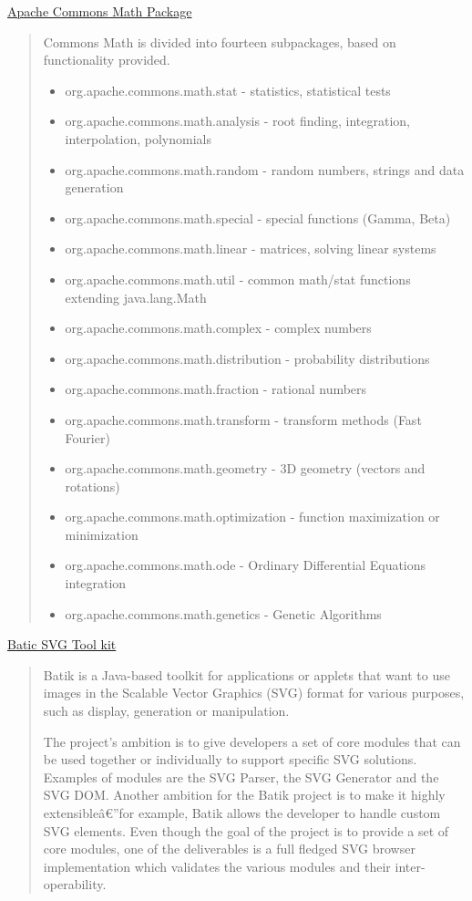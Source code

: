 \documentclass[11pt,a4paper,oneside]{report}
\begin{document}
\href{http://commons.apache.org/math/}{Apache Commons Math Package}
\begin{shaded}
\begin{quote}
Commons Math is divided into fourteen subpackages, based on functionality provided.
\begin{itemize}
\item org.apache.commons.math.stat - statistics, statistical tests
\item org.apache.commons.math.analysis - root finding, integration,
interpolation, polynomials
\item org.apache.commons.math.random - random numbers, strings and data generation
\item org.apache.commons.math.special - special functions (Gamma, Beta)
\item org.apache.commons.math.linear - matrices, solving linear systems
\item org.apache.commons.math.util - common math/stat functions extending java.lang.Math
\item org.apache.commons.math.complex - complex numbers
\item org.apache.commons.math.distribution - probability distributions
\item org.apache.commons.math.fraction - rational numbers
\item org.apache.commons.math.transform - transform methods (Fast Fourier)
\item org.apache.commons.math.geometry - 3D geometry (vectors and rotations)
\item org.apache.commons.math.optimization - function maximization or minimization
\item org.apache.commons.math.ode - Ordinary Differential Equations integration
\item org.apache.commons.math.genetics - Genetic Algorithms
\end{itemize}
\end{quote}
\end{shaded}

\href{http://xmlgraphics.apache.org/batik/}{Batic SVG Tool kit}
\begin{shaded}
\begin{quote}
Batik is a Java-based toolkit for applications or applets that want to use images 
in the Scalable Vector Graphics (SVG) format for various purposes, 
such as display, generation or manipulation.

The project's ambition is to give developers a set of core modules 
that can be used together or individually to support specific SVG solutions. 
Examples of modules are the SVG Parser, the SVG Generator and the SVG DOM. 
Another ambition for the Batik project is to make it highly extensibleâ€”for example, 
Batik allows the developer to handle custom SVG elements. 
Even though the goal of the project is to provide a set of core modules, one of the 
deliverables is a full fledged SVG browser implementation which validates the various modules 
and their inter-operability.
\end{quote}
\end{shaded}
\end{document}
